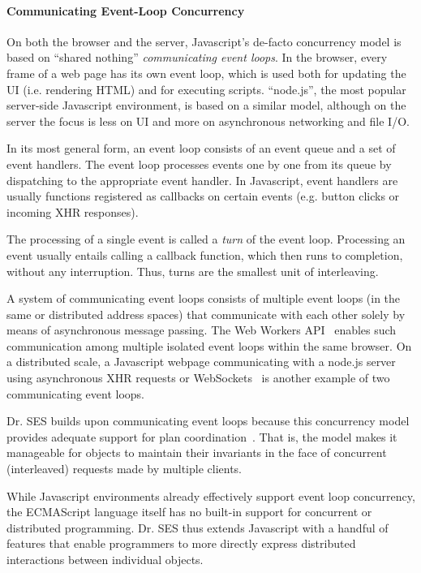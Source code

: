 \documentclass{llncs}
\begin{document}

\paragraph{Communicating Event-Loop Concurrency}

On both the browser and the server, Javascript's de-facto concurrency model is based on ``shared nothing'' \emph{communicating event loops}. In the browser, every frame of a web page has its own event loop, which is used both for updating the UI (i.e. rendering HTML) and for executing scripts. ``node.js'', the most popular server-side Javascript environment, is based on a similar model, although on the server the focus is less on UI and more on asynchronous networking and file I/O.

In its most general form, an event loop consists of an event queue and a set of event handlers. The event loop processes events one by one from its queue by dispatching to the appropriate event handler. In Javascript, event handlers are usually functions registered as callbacks on certain events (e.g. button clicks or incoming XHR responses).

The processing of a single event is called a \emph{turn} of the event loop. Processing an event usually entails calling a callback function, which then runs to completion, without any interruption. Thus, turns are the smallest unit of interleaving.

A system of communicating event loops consists of multiple event loops (in the same or distributed address spaces) that communicate with each other solely by means of asynchronous message passing. The Web Workers API~\cite{webworkerspec} enables such communication among multiple isolated event loops within the same browser. On a distributed scale, a Javascript webpage communicating with a node.js server using asynchronous XHR requests or WebSockets~\cite{websocketsspec} is another example of two communicating event loops.

Dr. SES builds upon communicating event loops because this concurrency model provides adequate support for plan coordination~\cite{miller:strangers}. That is, the model makes it manageable for objects to maintain their invariants in the face of concurrent (interleaved) requests made by multiple clients.

While Javascript environments already effectively support event loop concurrency, the ECMAScript language itself has no built-in support for concurrent or distributed programming. Dr. SES thus extends Javascript with a handful of features that enable programmers to more directly express distributed interactions between individual objects.
\end{document}
